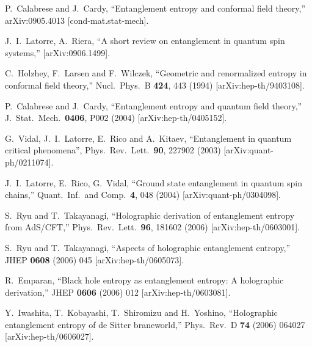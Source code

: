 \documentclass[12pt]{article}
\begin{document}
\begin{thebibliography}{99}
  P.~Calabrese and J.~Cardy,
  ``Entanglement entropy and conformal field theory,''
  arXiv:0905.4013 [cond-mat.stat-mech].

J.~I.~Latorre, A.~Riera,
``A short review on entanglement in quantum spin systems,''
[arXiv:0906.1499]. 



C.~Holzhey, F.~Larsen and F.~Wilczek,
  ``Geometric and renormalized entropy in conformal field theory,''
  Nucl.\ Phys.\ B {\bf 424}, 443 (1994)
  [arXiv:hep-th/9403108].

  P.~Calabrese and J.~Cardy,
  ``Entanglement entropy and quantum field theory,''
  J.\ Stat.\ Mech.\  {\bf 0406}, P002 (2004)
  [arXiv:hep-th/0405152].



G.\ Vidal, J.\ I.\ Latorre, E.\ Rico and A.\ Kitaev,
``Entanglement in quantum critical phenomena'',
Phys.\ Rev.\ Lett.\ \textbf{90}, 227902 (2003)
[arXiv:quant-ph/0211074].

J.\ I.\ Latorre, E.\ Rico, G.\ Vidal,
``Ground state entanglement in quantum spin chains,''
Quant.\ Inf.\ and Comp.\ \textbf{4}, 048 (2004)
[arXiv:quant-ph/0304098].


S.~Ryu and T.~Takayanagi,
  ``Holographic derivation of entanglement entropy from AdS/CFT,''
Phys.\ Rev.\ Lett.\ \textbf{96}, 181602 (2006)
 [arXiv:hep-th/0603001].

  S.~Ryu and T.~Takayanagi,
  ``Aspects of holographic entanglement entropy,''
  JHEP {\bf 0608} (2006) 045
  [arXiv:hep-th/0605073].



  R.~Emparan,
  ``Black hole entropy as entanglement entropy: A holographic derivation,''
  JHEP {\bf 0606} (2006) 012
  [arXiv:hep-th/0603081].


  Y.~Iwashita, T.~Kobayashi, T.~Shiromizu and H.~Yoshino,
  ``Holographic entanglement entropy of de Sitter braneworld,''
  Phys.\ Rev.\  D {\bf 74} (2006) 064027
  [arXiv:hep-th/0606027].


\end{thebibliography}
\end{document}
